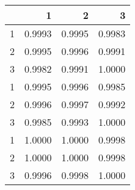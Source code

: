 \begin{tabular}{lrrr}
\toprule
{} &       1 &       2 &       3 \\
\midrule
1 &  0.9993 &  0.9995 &  0.9983 \\
2 &  0.9995 &  0.9996 &  0.9991 \\
3 &  0.9982 &  0.9991 &  1.0000 \\
1 &  0.9995 &  0.9996 &  0.9985 \\
2 &  0.9996 &  0.9997 &  0.9992 \\
3 &  0.9985 &  0.9993 &  1.0000 \\
1 &  1.0000 &  1.0000 &  0.9998 \\
2 &  1.0000 &  1.0000 &  0.9998 \\
3 &  0.9996 &  0.9998 &  1.0000 \\
\bottomrule
\end{tabular}
